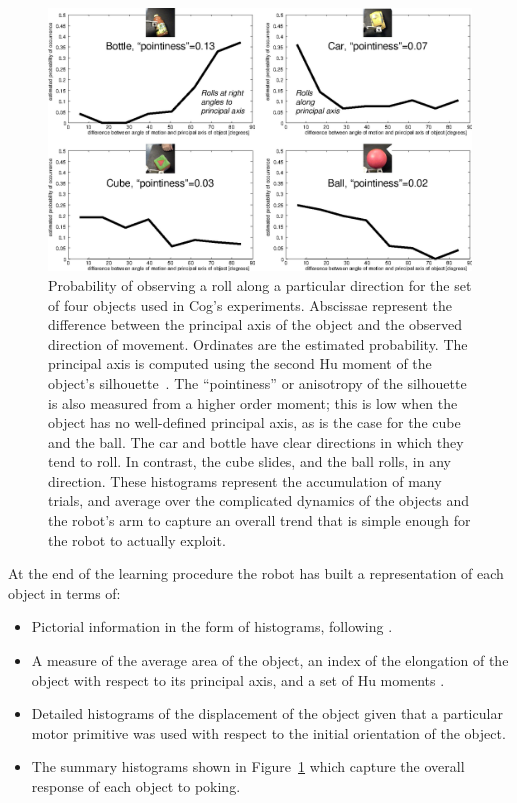 %
%
\begin{figure}[tb]
\begin{center}
\includegraphics[width=\columnwidth]{affordances.eps}
\caption{ 
\label{fig:affordances}
%
%
Probability of observing a roll along a particular direction for the set of
four objects used in Cog's experiments. Abscissae represent the difference
between the principal axis of the object and the observed direction of movement.
Ordinates are the estimated probability.
\ifrevised
The principal axis is computed using the second Hu moment of the
object's silhouette~\cite{hu62visual}.  The ``pointiness'' or
anisotropy of the silhouette is also measured from a higher order
moment; this is low when the object has no well-defined principal
axis, as is the case for the cube and the ball.
\fi
\ifrevised
The car and bottle have clear directions in which they tend to
roll.  In contrast, the cube slides, and the ball rolls, in any direction.
\fi
\ifrevised
These histograms represent the accumulation of many trials, and
average over the complicated dynamics of the objects and the robot's
arm to capture an overall trend that is simple enough for the robot
to actually exploit.
\fi
}
\end{center}
\end{figure}
%
%

\ifrevised
At the end of the learning procedure the robot has built a
representation of each object in terms of:

{
\begin{itemize} \pflist
  \item Pictorial information in the form of \ahhcolor{} histograms,
        following \cite{swain91color}.
  \item A measure of the average area of the object, an
        index of the elongation of the object with respect to its principal
        axis, and a set of Hu moments \cite{hu62visual}.
  \item Detailed histograms of the displacement of the object given that a 
	particular motor primitive was used with respect to the initial 
	orientation of the object.
  \item The summary histograms shown in Figure~\ref{fig:affordances}
        which capture the overall response of each object to poking.
\end{itemize}
}

